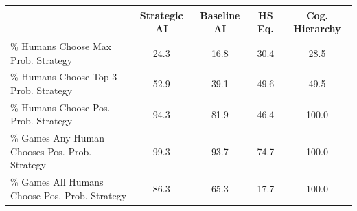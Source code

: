 \begin{tabular}{lcccc}
\toprule
 & Strategic AI & Baseline AI & HS Eq. & Cog. Hierarchy\\
\midrule
\% Humans Choose Max Prob. Strategy & 24.3 & 16.8 & 30.4 & 28.5\\
\% Humans Choose Top 3 Prob. Strategy & 52.9 & 39.1 & 49.6 & 49.5\\
\% Humans Choose Pos. Prob. Strategy & 94.3 & 81.9 & 46.4 & 100.0\\
\% Games Any Human Chooses Pos. Prob. Strategy & 99.3 & 93.7 & 74.7 & 100.0\\
\% Games All Humans Choose Pos. Prob. Strategy & 86.3 & 65.3 & 17.7 & 100.0\\
\bottomrule
\end{tabular}
